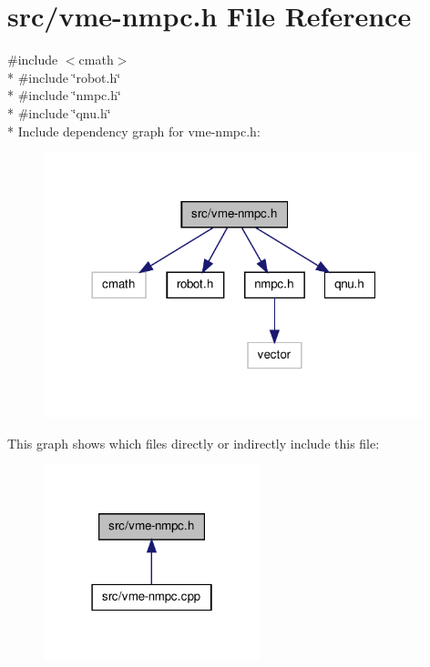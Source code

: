 \hypertarget{vme-nmpc_8h}{\section{src/vme-\/nmpc.h File Reference}
\label{vme-nmpc_8h}
}
{\ttfamily \#include $<$cmath$>$}\\*
{\ttfamily \#include \char`\"{}robot.\-h\char`\"{}}\\*
{\ttfamily \#include \char`\"{}nmpc.\-h\char`\"{}}\\*
{\ttfamily \#include \char`\"{}qnu.\-h\char`\"{}}\\*
Include dependency graph for vme-\/nmpc.h\-:
\nopagebreak
\begin{figure}[H]
\begin{center}
\leavevmode
\includegraphics[width=312pt]{vme-nmpc_8h__incl}
\end{center}
\end{figure}
This graph shows which files directly or indirectly include this file\-:
\nopagebreak
\begin{figure}[H]
\begin{center}
\leavevmode
\includegraphics[width=178pt]{vme-nmpc_8h__dep__incl}
\end{center}
\end{figure}
